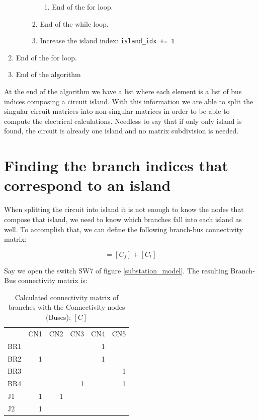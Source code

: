 \documentclass[nols,a4paper,twoside,notoc,fleqn]{tufte-book}
\begin{document}
\begin{enumerate}
\begin{enumerate}
\begin{enumerate}
\begin{enumerate}
				\item End of the for loop.
				
			\end{enumerate}
			
			\item End of the while loop.
			
			\item Increase the island index: \verb|island_idx += 1|
			
		\end{enumerate}
		
	\end{enumerate}
	
	\item End of the for loop.
	
	\item End of the algorithm
\end{enumerate}

At the end of the algorithm we have a list where each element is a list of bus indices composing a circuit island. With this information we are able to split the singular circuit matrices into non-singular matrices in order to be able to compute the electrical calculations. Needless to say that if only only island is found, the circuit is already one island and no matrix subdivision is needed.

\section{Finding the branch indices that correspond to an island}

When splitting the circuit into island it is not enough to know the nodes that compose that island, we need to know which branches fall into each island as well. To accomplish that, we can define the following branch-bus connectivity matrix:

\begin{equation}
[C] = [C_f] + [C_t]
\end{equation}

Say we open the switch SW7 of figure \ref{substation_model}. The resulting Branch-Bus connectivity matrix is:

\begin{table}[h!]
 \begin{tabular}{lrrrrr}
	{} &  CN1 &  CN2 &  CN3 &  CN4 &  CN5 \\
	BR1 &      &      &      &    1 &      \\
	BR2 &    1 &      &      &    1 &      \\
	BR3 &      &      &      &      &    1 \\
	BR4 &      &      &    1 &      &    1 \\
	J1  &    1 &    1 &      &      &      \\
	J2  &    1 &      &      &      &      \\
\end{tabular}
	\caption{Calculated connectivity matrix of branches with the Connectivity nodes (Buses): $[C]$}
\end{table}
\end{document}
